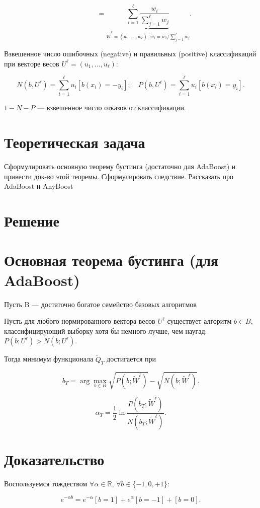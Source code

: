 \[
\phantom{Q_T \leq \widetilde{Q}_T} = \underbrace{\sum_{i=1}^\ell \frac{w_i}{\sum_{j=1}^\ell w_j}}_{\widetilde{W}^\ell = (\widetilde{w}_1, \ldots, \widetilde{w}_\ell), \, \widetilde{w}_i = w_i / \sum_{j=1}^\ell w_j}.
\]

Взвешенное число ошибочных (negative) и правильных (positive) классификаций при векторе весов \(U^\ell = (u_1, \ldots, u_\ell)\):

\[
N(b, U^\ell) = \sum_{i=1}^\ell u_i [b(x_i) = -y_i]; \quad P(b, U^\ell) = \sum_{i=1}^\ell u_i [b(x_i) = y_i].
\]

\(1 - N - P\) — взвешенное число отказов от классификации.

\section*{Теоретическая задача}
Сформулировать основную теорему бустинга (достаточно для AdaBoost) и привести док-во этой теоремы. Сформулировать следствие. Рассказать про AdaBoost и AnyBoost

\section*{Решение}
\section*{Основная теорема бустинга (для AdaBoost)}
Пусть B — достаточно богатое семейство базовых алгоритмов

Пусть для любого нормированного вектора весов \(U^\ell\) существует алгоритм \(b \in B\), классифицирующий выборку хотя бы немного лучше, чем наугад: \(P(b; U^\ell) > N(b; U^\ell)\).

Тогда минимум функционала \(\widetilde{Q}_T\) достигается при

\[
b_T = \arg \max_{b \in B} \sqrt{P(b; \widetilde{W}^\ell)} - \sqrt{N(b; \widetilde{W}^\ell)}.
\]

\[
\alpha_T = \frac{1}{2} \ln \frac{P(b_T; \widetilde{W}^\ell)}{N(b_T; \widetilde{W}^\ell)}.
\]

\section*{Доказательство}

Воспользуемся тождеством \(\forall \alpha \in \mathbb{R}, \, \forall b \in \{-1, 0, +1\}\):

\[
e^{-\alpha b} = e^{-\alpha}[b = 1] + e^{\alpha}[b = -1] + [b = 0].
\]


